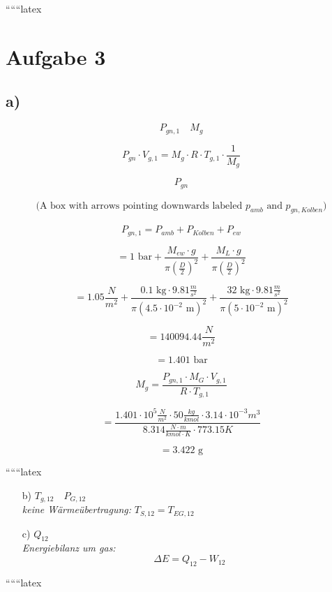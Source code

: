 
``````latex


\section*{Aufgabe 3}

\subsection*{a)}

\[
P_{gn,1} \quad M_g
\]

\[
P_{gn} \cdot V_{g,1} = M_g \cdot R \cdot T_{g,1} \cdot \frac{1}{M_g}
\]

\[
P_{gn}
\]

\[
\begin{array}{c}
\text{(A box with arrows pointing downwards labeled } p_{amb} \text{ and } p_{gn, Kolben} \text{)}
\end{array}
\]

\[
P_{gn,1} = P_{amb} + P_{Kolben} + P_{ew}
\]

\[
= 1 \text{ bar} + \frac{M_{ew} \cdot g}{\pi \left( \frac{D}{2} \right)^2} + \frac{M_L \cdot g}{\pi \left( \frac{D}{2} \right)^2}
\]

\[
= 1.05 \frac{N}{m^2} + \frac{0.1 \text{ kg} \cdot 9.81 \frac{m}{s^2}}{\pi \left( 4.5 \cdot 10^{-2} \text{ m} \right)^2} + \frac{32 \text{ kg} \cdot 9.81 \frac{m}{s^2}}{\pi \left( 5 \cdot 10^{-2} \text{ m} \right)^2}
\]

\[
= 140094.44 \frac{N}{m^2}
\]

\[
= 1.401 \text{ bar}
\]

\[
M_g = \frac{P_{gn,1} \cdot M_{G} \cdot V_{g,1}}{R \cdot T_{g,1}}
\]

\[
= \frac{1.401 \cdot 10^5 \frac{N}{m^2} \cdot 50 \frac{kg}{kmol} \cdot 3.14 \cdot 10^{-3} m^3}{8.314 \frac{N \cdot m}{kmol \cdot K} \cdot 773.15 K}
\]

\[
= 3.422 \text{ g}
\]

``````latex


\begin{itemize}
    \item[b)] $T_{g,12} \quad P_{G,12}$ \\
    \textit{keine Wärmeübertragung:} \quad $T_{S,12} = T_{EG,12}$
    
    \item[c)] $Q_{12}$ \\
    \textit{Energiebilanz um gas:} \\
    \[
    \Delta E = Q_{12} - W_{12}
    \]
\end{itemize}

``````latex


